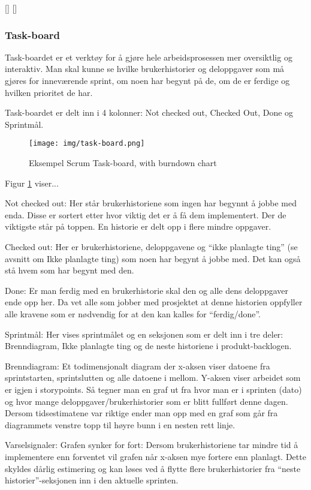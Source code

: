\documentclass[12pt,a4paper,norsk]{article}
\begin{document}
    [\cite{scrummaster}]
    [\cite{scrummasterrolle}]
   
    
	
	\subsubsection{Task-board}
	Task-boardet er et verktøy for å gjøre hele arbeidsprosessen mer oversiktlig og interaktiv. Man skal kunne se hvilke brukerhistorier og deloppgaver som må gjøres for inneværende sprint, om noen har begynt på de, om de er ferdige og hvilken prioritet de har.

    Task-boardet er delt inn i 4 kolonner: Not checked out, Checked Out, Done og Sprintmål.
    
    \begin{figure}[h!]
 		\texttt{[image: img/task-board.png]}
  		\caption{Eksempel Scrum Task-board, with burndown chart}
  		\label{fig:task-board}
	\end{figure}
	Figur \ref{fig:task-board} viser...
    
    Not checked out: Her står brukerhistoriene som ingen har begynnt å jobbe med enda. Disse er sortert etter hvor viktig det er å få dem implementert. Der de viktigste står på toppen. En historie er delt opp i flere mindre oppgaver.

    Checked out: Her er brukerhistoriene, deloppgavene og “ikke planlagte ting” (se avsnitt om Ikke planlagte ting) som noen har begynt å jobbe med. Det kan også stå hvem som har begynt med den.

    Done: Er man ferdig med en brukerhistorie skal den og alle dens deloppgaver ende opp her. Da vet alle som jobber med prosjektet at denne historien oppfyller alle kravene som er nødvendig for at den kan kalles for “ferdig/done”.
	
    Sprintmål: Her vises sprintmålet og en seksjonen som er delt inn i tre deler: Brenndiagram, Ikke planlagte ting og de neste historiene i produkt-backlogen.

    Brenndiagram:
    Et todimensjonalt diagram der x-aksen viser datoene fra sprintstarten, sprintslutten og alle datoene i mellom. Y-aksen viser arbeidet som er igjen i storypoints. Så tegner man en graf ut fra hvor man er i sprinten (dato) og hvor mange deloppgaver/brukerhistorier som er blitt fullført denne dagen. Dersom tidsestimatene var riktige ender man opp med en graf som går fra diagrammets venstre topp til høyre bunn i en nesten rett linje.

    Varselsignaler:
	Grafen synker for fort:
    Dersom brukerhistoriene tar mindre tid å implementere enn forventet vil grafen når x-aksen mye fortere enn planlagt. Dette skyldes dårlig estimering og kan løses ved å flytte flere brukerhistorier fra “neste historier”-seksjonen inn i den aktuelle sprinten.
\end{document}
